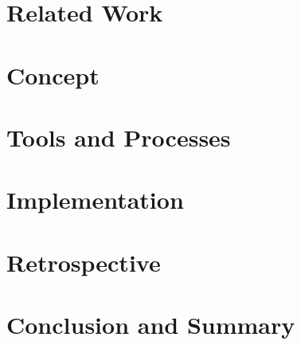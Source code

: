 \documentclass{clbthesis}
\begin{document}
\chapter{Related Work}						


\chapter{Concept}	
\label{ch:concept}						


\chapter{Tools and Processes}					


\chapter{Implementation}						


\chapter{Retrospective} 			


\chapter{Conclusion and Summary}				




\cleardoublepage
{}
{}\listoffigures

\listoftables


\appendix



% 
\end{document}
